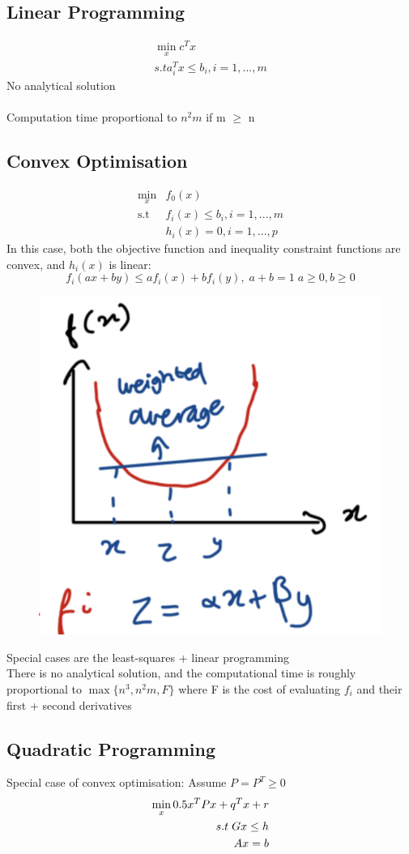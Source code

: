 \documentclass{article}
\begin{document}
\subsection{Linear Programming}
\[ 
\begin{aligned}
\min_x c^T x \\ s.t a_i^T x \leq b_i, i=1,...,m
\end{aligned}
\]
No analytical solution 
\\ \\ Computation time proportional to $n^2m$ if m $\geq$ n
\subsection{Convex Optimisation}
\[
\begin{aligned}
\min_x &f_0(x) \\ \text{s.t}  \; &f_i(x) \leq b_i, i=1,...,m \\ &h_i(x) = 0, i=1,...,p
\end{aligned}
\]
In this case, both the objective function and inequality constraint functions are convex, and $h_i(x)$ is linear:
\[
f_i(ax + by) \leq af_i(x) + bf_i(y), \; a+b =1 \; a \geq 0, b \geq 0
\]
\begin{figure}[H]
\centering
\includegraphics[width=0.2\linewidth]{Screenshot 2023-01-23 at 17.04.34.png}
\end{figure}
Special cases are the least-squares + linear programming \\ 
There is no analytical solution, and the computational time is roughly proportional to $\max \{n^3,n^2m,F\}$ where F is the cost of evaluating $f_i$ and their first + second derivatives
\subsection{Quadratic Programming}
Special case of convex optimisation: Assume $P = P^T \geq 0$
\[
\centering
\begin{aligned}
\min_x 0.5x^T P x + q^T x + r \\ s.t \;  Gx \leq h \\ Ax = b
\end{aligned}
\]
\end{document}
